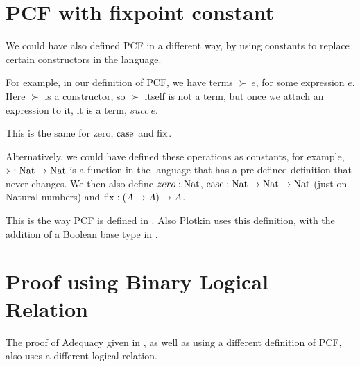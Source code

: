 \section{PCF with fixpoint constant}

We could have also defined PCF in a different way, by using constants to replace certain constructors in the language.

For example, in our definition of PCF, we have terms $\succ \ e$, for some expression $e$. Here $\succ$ is a constructor, so $\succ$ itself is not a term, but once we attach an expression to it, it is a term, $succ \ e$.

This is the same for zero, $\operatorname{case}$ and $\operatorname{fix}$.

Alternatively, we could have defined these operations as constants, for example, $\succ : \operatorname{Nat} \to \operatorname{Nat}$ is a function in the language that has a pre defined definition that never changes. We then also define $zero : \operatorname{Nat}$, $\operatorname{case} : \operatorname{Nat} \to \operatorname{Nat} \to \operatorname{Nat}$ (just on Natural numbers) and $\operatorname{fix} : (A \to A) \to A$.

This is the way PCF is defined in \citep{Streicher06}. Also Plotkin uses this definition, with the addition of a Boolean base type in \citep{Plotkin77}.

\section{Proof using Binary Logical Relation}

The proof of Adequacy given in \citep{Streicher06}, as well as using a different definition of PCF, also uses a different logical relation.



